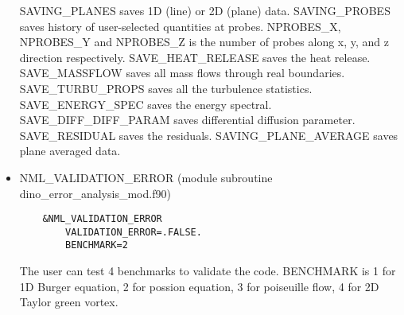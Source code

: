 \begin{itemize}
  SAVING\_PLANES saves 1D (line) or 2D (plane) data. SAVING\_PROBES saves history of user-selected quantities at probes. NPROBES\_X, NPROBES\_Y and NPROBES\_Z is the number of probes along x, y, and z direction respectively. SAVE\_HEAT\_RELEASE saves the heat release. SAVE\_MASSFLOW saves all mass flows through real boundaries. SAVE\_TURBU\_PROPS saves all the turbulence statistics. SAVE\_ENERGY\_SPEC saves the energy spectral. SAVE\_DIFF\_DIFF\_PARAM saves differential diffusion parameter. SAVE\_RESIDUAL saves the residuals. SAVING\_PLANE\_AVERAGE saves plane averaged data.
  \item NML\_VALIDATION\_ERROR (module subroutine dino\_error\_analysis\_mod.f90)
  \begin{lstlisting}
    &NML_VALIDATION_ERROR
        VALIDATION_ERROR=.FALSE.
        BENCHMARK=2
  \end{lstlisting}
  The user can test 4 benchmarks to validate the code.
  BENCHMARK is 1 for 1D Burger equation, 2 for possion equation, 3 for poiseuille flow, 4 for 2D Taylor green vortex.
\end{itemize}
